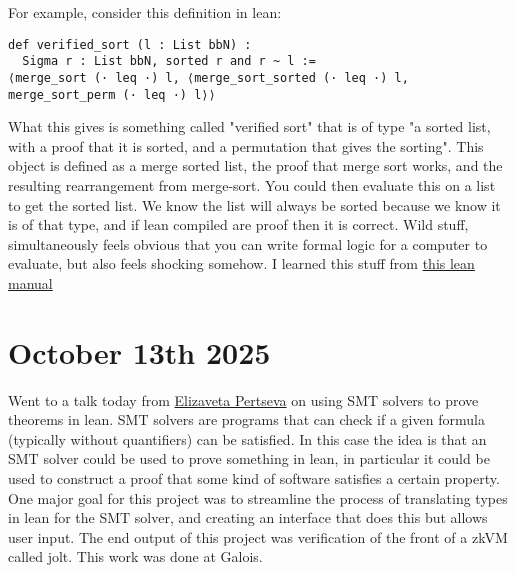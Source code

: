 \documentclass{amsart}
\theoremstyle{definition}
\begin{document}
For example, consider this definition in lean:


\begin{verbatim}
def verified_sort (l : List bbN) :
  Sigma r : List bbN, sorted r and r ~ l :=
⟨merge_sort (· leq ·) l, ⟨merge_sort_sorted (· leq ·) l, merge_sort_perm (· leq ·) l⟩⟩
\end{verbatim}


What this gives is something called "verified sort" that is of type "a sorted list, with a proof that it is sorted, and a permutation that gives the sorting". This object is defined as a merge sorted list, the proof that merge sort works, and the resulting rearrangement from merge-sort. You could then evaluate this on a list to get the sorted list. We know the list will always be sorted because we know it is of that type, and if lean compiled are proof then it is correct. Wild stuff, simultaneously feels obvious that you can write formal logic for a computer to evaluate, but also feels shocking somehow. I learned this stuff from \href{https://lean-lang.org/theorem_proving_in_lean4/Propositions-and-Proofs/#propositions-and-proofs}{this lean manual}

\section{October 13th 2025}

Went to a talk today from \href{https://www.galois.com/articles/automated-lean-proofs-for-every-type}{Elizaveta Pertseva} on using SMT solvers to prove theorems in lean. SMT solvers are programs that can check if a given formula (typically without quantifiers) can be satisfied. In this case the idea is that an SMT solver could be used to prove something in lean, in particular it could be used to construct a proof that some kind of software satisfies a certain property. One major goal for this project was to streamline the process of translating types in lean for the SMT solver, and creating an interface that does this but allows user input. The end output of this project was verification of the front of a zkVM called jolt. This work was done at Galois.


\nocite{*}

{}
\end{document}
